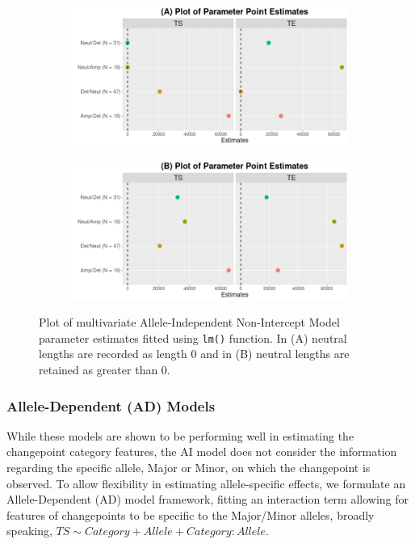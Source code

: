\begin{figure}[H]
\vspace{0.5cm}
     \begin{subfigure}[t]{.49\textwidth}
      \centering
      \includegraphics[width = 1\textwidth]{../figures/Chapter_5/Multivariate_lm_6_AI_Interval.png}
    \end{subfigure}%
     \begin{subfigure}[t]{.49\textwidth}
      \centering
       \includegraphics[width = 1\textwidth]{../figures/Chapter_5/Multivariate_lm_6_Neut_AI_Interval.png}
    \end{subfigure} 
     \caption[Plot of multivariate Allele-Independent Non-Intercept Model parameter estimates fitted using \texttt{lm()} function.]{Plot of multivariate Allele-Independent Non-Intercept Model parameter estimates fitted using \texttt{lm()} function. In (A) neutral lengths are recorded as length 0 and in (B) neutral lengths are retained as greater than 0.}
     \label{fig:lm_multi_2_int}
\end{figure}

\subsubsection{Allele-Dependent (AD) Models}
While these models are shown to be performing well in estimating the changepoint category features, the AI model does not consider the information regarding the specific allele, Major or Minor, on which the changepoint is observed. To allow flexibility in estimating allele-specific effects, we formulate an Allele-Dependent (AD) model framework, fitting an interaction term allowing for features of changepoints to be specific to the Major/Minor alleles, broadly speaking, $TS\sim Category + Allele + Category:Allele$.  

